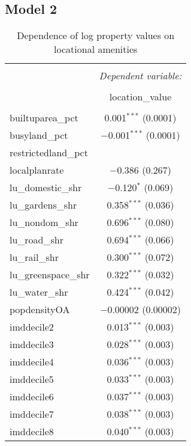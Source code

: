 \documentclass{article}\usepackage[]{graphicx}\usepackage[]{color}
\begin{document}
\subsection{Model 2}\label{section:model 2}

\begin{table}[!htbp] \centering 
  \caption{Dependence of log property values on locational amenities } 
  \label{} 
\small 
\begin{tabular}{@{\extracolsep{5pt}}lc} 
\\[-1.8ex]\hline 
\hline \\[-1.8ex] 
 & \multicolumn{1}{c}{\textit{Dependent variable:}} \\ 
\cline{2-2} 
\\[-1.8ex] & location\_value \\ 
\hline \\[-1.8ex] 
 builtuparea\_pct & 0.001$^{***}$ (0.0001) \\ 
  busyland\_pct & $-$0.001$^{***}$ (0.0001) \\ 
  restrictedland\_pct &  \\ 
  localplanrate & $-$0.386 (0.267) \\ 
  lu\_domestic\_shr & $-$0.120$^{*}$ (0.069) \\ 
  lu\_gardens\_shr & 0.358$^{***}$ (0.036) \\ 
  lu\_nondom\_shr & 0.696$^{***}$ (0.080) \\ 
  lu\_road\_shr & 0.694$^{***}$ (0.066) \\ 
  lu\_rail\_shr & 0.300$^{***}$ (0.072) \\ 
  lu\_greenspace\_shr & 0.322$^{***}$ (0.032) \\ 
  lu\_water\_shr & 0.424$^{***}$ (0.042) \\ 
  popdensityOA & $-$0.00002 (0.00002) \\ 
  imddecile2 & 0.013$^{***}$ (0.003) \\ 
  imddecile3 & 0.028$^{***}$ (0.003) \\ 
  imddecile4 & 0.036$^{***}$ (0.003) \\ 
  imddecile5 & 0.033$^{***}$ (0.003) \\ 
  imddecile6 & 0.037$^{***}$ (0.003) \\ 
  imddecile7 & 0.038$^{***}$ (0.003) \\ 
  imddecile8 & 0.040$^{***}$ (0.003) \\ 

\end{tabular}
\end{table}
\end{document}
